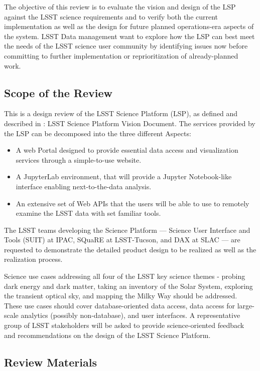 \documentclass[DM,lsstdraft,STS,toc]{lsstdoc}
\begin{document}
The objective of this review is to evaluate the vision and design of the LSP against the LSST science requirements and to verify both the current implementation
as well as the design for future planned operations-era aspects of the system.  LSST Data management want to explore how the LSP can best meet the needs of the LSST science user community by
identifying issues now before committing to further implementation or reprioritization of already-planned work.


\subsection{Scope of the Review}
\label{sec:scope}
This is a design review of the LSST Science Platform (LSP), as defined and described in : LSST Science Platform Vision Document.
The services provided by the LSP can be decomposed into the three different Aspects:
\begin{itemize}
\item A web Portal designed to provide essential data access and visualization services through a simple-to-use website.
\item A JupyterLab environment, that will provide a Jupyter Notebook-like interface enabling next-to-the-data analysis.
\item An extensive set of Web APIs that the users will be able to use to remotely examine the LSST data with set familiar tools.
\end{itemize}

The LSST teams developing the Science Platform --- Science User Interface and Tools (SUIT) at IPAC, SQuaRE at LSST-Tucson, and DAX at SLAC --- are
requested to demonstrate the detailed product design to be realized as well as the realization process.

Science use cases addressing all four of the LSST key science themes - probing dark energy and dark matter,
taking an inventory of the Solar System, exploring the transient optical sky, and mapping the Milky Way should be addressed.
These use cases should cover database-oriented data access, data access for large-scale analytics (possibly non-database), and user interfaces.
A representative group of LSST stakeholders will be asked to provide science-oriented feedback and recommendations on the design of the LSST Science Platform.

\subsection{Review Materials}
\label{sec:materials}
\end{document}
